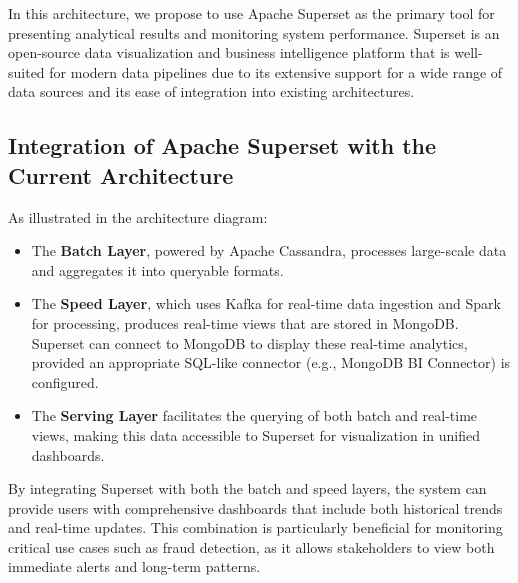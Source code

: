 \documentclass[12pt,a4paper, hidelinks]{article}
\begin{document}
In this architecture, we propose to use Apache Superset as the primary tool for presenting analytical results and monitoring system performance. Superset is an open-source data visualization and business intelligence platform that is well-suited for modern data pipelines due to its extensive support for a wide range of data sources and its ease of integration into existing architectures.

\subsection{Integration of Apache Superset with the Current Architecture}
As illustrated in the architecture diagram:
\begin{itemize}
    \item The \textbf{Batch Layer}, powered by Apache Cassandra, processes large-scale data and aggregates it into queryable formats.
    \item The \textbf{Speed Layer}, which uses Kafka for real-time data ingestion and Spark for processing, produces real-time views that are stored in MongoDB. Superset can connect to MongoDB to display these real-time analytics, provided an appropriate SQL-like connector (e.g., MongoDB BI Connector) is configured.
    \item The \textbf{Serving Layer} facilitates the querying of both batch and real-time views, making this data accessible to Superset for visualization in unified dashboards.
\end{itemize}

By integrating Superset with both the batch and speed layers, the system can provide users with comprehensive dashboards that include both historical trends and real-time updates. This combination is particularly beneficial for monitoring critical use cases such as fraud detection, as it allows stakeholders to view both immediate alerts and long-term patterns.
\end{document}
